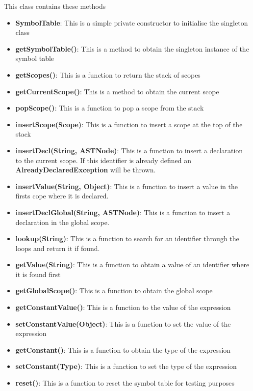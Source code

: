 \documentclass{article}
\begin{document}
			This class contains these methods
			\begin{itemize}
			\item \textbf{SymbolTable}: This is a simple private constructor to initialise the singleton class
			\item \textbf{getSymbolTable()}: This is a method to obtain the singleton instance of the symbol table
			\item \textbf{getScopes()}: This is a function to return the stack of scopes
			\item \textbf{getCurrentScope()}: This is a method to obtain the current scope
			\item \textbf{popScope()}: This is a function to pop a scope from the stack
			\item \textbf{insertScope(Scope)}: This is a function to insert a scope at the top of the stack
			\item \textbf{insertDecl(String, ASTNode)}: This is a function to insert a declaration to the current scope. If this identifier is already defined an \textbf{AlreadyDeclaredException} will be thrown.
			\item \textbf{insertValue(String, Object)}: This is a function to insert a value in the firsts cope where it is declared.
			\item \textbf{insertDeclGlobal(String, ASTNode)}: This is a function to insert a declaration in the global scope. %
			\item \textbf{lookup(String)}: This is a function to search for an identifier through the loops and return it if found.
			\item \textbf{getValue(String)}: This is a function to obtain a value of an identifier where it is found first
			\item \textbf{getGlobalScope()}: This is a function to obtain the global scope
			\item \textbf{getConstantValue()}: This is a function to the value of the expression
			\item \textbf{setConstantValue(Object)}: This is a function to set the value of the expression
			\item \textbf{getConstant()}: This is a function to obtain the type of the expression
			\item \textbf{setConstant(Type)}: This is a function to set the type of the expression
			\item \textbf{reset()}: This is a function to reset the symbol table for testing purposes
			
			\end{itemize}
			
\end{document}
